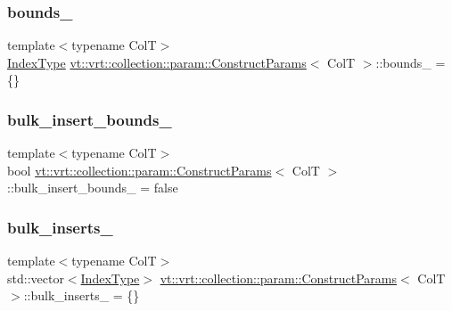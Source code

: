 \subsubsection{\texorpdfstring{bounds\+\_\+}{bounds\_}}
{\footnotesize\ttfamily template$<$typename ColT$>$ \\
\hyperlink{structvt_1_1vrt_1_1collection_1_1param_1_1_construct_params_a7bc8d5d57e377e0f2e60031582eeb7e6}{Index\+Type} \hyperlink{structvt_1_1vrt_1_1collection_1_1param_1_1_construct_params}{vt\+::vrt\+::collection\+::param\+::\+Construct\+Params}$<$ ColT $>$\+::bounds\+\_\+ = \{\}\hspace{0.3cm}{\ttfamily [private]}}

\mbox{\label{structvt_1_1vrt_1_1collection_1_1param_1_1_construct_params_aa847998b769d10a8badfc95543113f52}} 
\subsubsection{\texorpdfstring{bulk\+\_\+insert\+\_\+bounds\+\_\+}{bulk\_insert\_bounds\_}}
{\footnotesize\ttfamily template$<$typename ColT$>$ \\
bool \hyperlink{structvt_1_1vrt_1_1collection_1_1param_1_1_construct_params}{vt\+::vrt\+::collection\+::param\+::\+Construct\+Params}$<$ ColT $>$\+::bulk\+\_\+insert\+\_\+bounds\+\_\+ = false\hspace{0.3cm}{\ttfamily [private]}}

\mbox{\label{structvt_1_1vrt_1_1collection_1_1param_1_1_construct_params_a4de8932b1c4f4e4e0998630cbe6ed08f}} 
\subsubsection{\texorpdfstring{bulk\+\_\+inserts\+\_\+}{bulk\_inserts\_}}
{\footnotesize\ttfamily template$<$typename ColT$>$ \\
std\+::vector$<$\hyperlink{structvt_1_1vrt_1_1collection_1_1param_1_1_construct_params_a7bc8d5d57e377e0f2e60031582eeb7e6}{Index\+Type}$>$ \hyperlink{structvt_1_1vrt_1_1collection_1_1param_1_1_construct_params}{vt\+::vrt\+::collection\+::param\+::\+Construct\+Params}$<$ ColT $>$\+::bulk\+\_\+inserts\+\_\+ = \{\}\hspace{0.3cm}{\ttfamily [private]}}

